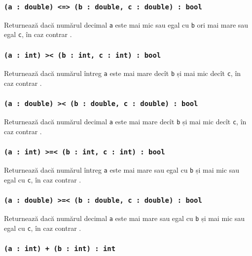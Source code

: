 \subsubsection{\texttt{(a : double) <=> (b : double, c : double) : bool}}

Returnează \true{} dacă numărul decimal \texttt{a} este mai mic sau egal cu \texttt{b} ori mai mare sau egal \texttt{c}, în caz contrar \false{}.

\subsubsection{\texttt{(a : int) >< (b : int, c : int) : bool}}

Returnează \true{} dacă numărul întreg \texttt{a} este mai mare decît \texttt{b} și mai mic decît \texttt{c}, în caz contrar \false{}.

\subsubsection{\texttt{(a : double) >< (b : double, c : double) : bool}}

Returnează \true{} dacă numărul decimal \texttt{a} este mai mare decît \texttt{b} și mai mic decît \texttt{c}, în caz contrar \false{}.

\subsubsection{\texttt{(a : int) >=< (b : int, c : int) : bool}}

Returnează \true{} dacă numărul întreg \texttt{a} este mai mare sau egal cu \texttt{b} și mai mic sau egal cu \texttt{c}, în caz contrar \false{}.

\subsubsection{\texttt{(a : double) >=< (b : double, c : double) : bool}}

Returnează \true{} dacă numărul decimal \texttt{a} este mai mare sau egal cu \texttt{b} și mai mic sau egal cu \texttt{c}, în caz contrar \false{}.

\subsubsection{\texttt{(a : int) + (b : int) : int}}

